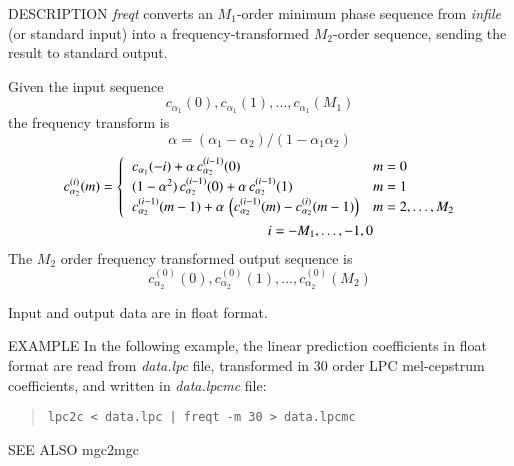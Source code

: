 \begin{qsection}{DESCRIPTION}
{\em freqt} converts an $M_1$-order minimum phase sequence 
from {\em infile} (or standard input) 
into a frequency-transformed $M_2$-order sequence,
sending the result to standard output.

Given the input sequence
\begin{displaymath}
c_{\alpha_1}(0), c_{\alpha_1}(1), \dots, c_{\alpha_1}(M_1)
\end{displaymath}
the frequency transform is
\begin{displaymath}
   \alpha = (\alpha_1 - \alpha_2) / (1 - \alpha_1 \alpha_2)
\end{displaymath}
\begin{align} 
c_{\alpha_2}^{(i)}(m) &=  
	\begin{cases}
          \;\; c_{\alpha_1}(-i)
	    +\alpha\,c_{\alpha_2}^{(i-1)}(0) &  m=0 \\
          \;\; (1-\alpha^2)\,c_{\alpha_2}^{(i-1)}(0)
            +\alpha\,c_{\alpha_2}^{(i-1)}(1) &  m=1 \\
          \;\; c_{\alpha_2}^{(i-1)}(m-1) 
	    +\alpha\, \left(c_{\alpha_2}^{(i-1)}(m)
	    -c_{\alpha_2}^{(i)}(m-1)\right) &   m=2,\dots,M_2
         \end{cases} \notag \\
& \qquad\qquad\qquad\qquad\qquad\qquad i = -M_1,\dots,-1,0 
\end{align}
The $M_2$ order frequency transformed output sequence is
\begin{displaymath}
c_{\alpha_2}^{(0)}(0), c_{\alpha_2}^{(0)}(1), \dots, c_{\alpha_2}^{(0)}(M_2)
\end{displaymath}
\par
Input and output data are in float format.
\end{qsection}

\begin{options}
\end{options}

\begin{qsection}{EXAMPLE}
In the following example, the linear prediction coefficients in
float format are read from {\em data.lpc} file, 
transformed in 30 order LPC mel-cepstrum coefficients,
and written in {\em data.lpcmc} file:
\begin{quote}
 \verb!lpc2c < data.lpc | freqt -m 30 > data.lpcmc!
\end{quote} 
\end{qsection}

\begin{qsection}{SEE ALSO}
mgc2mgc
\end{qsection}
